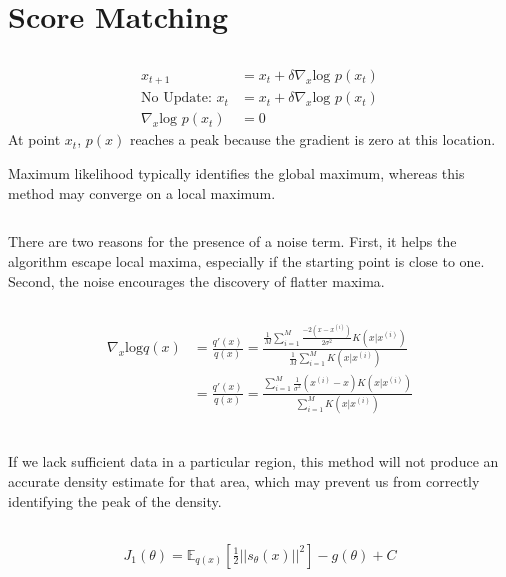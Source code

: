 \documentclass{article}
\newcommand*{\ex}[1]{
    \mathbb{E}_{#1}
}
\begin{document}
\section{Score Matching}
\subsection{}
\begin{align*}
    x_{t+1} &= x_{t} + \delta \nabla_x \text{log } p(x_t) \\
    \text{No Update: } x_t &= x_t + \delta \nabla_x \text{log } p(x_t) \\
    \nabla_x \text{log } p(x_t) &= 0
\end{align*}
At point $x_t$, $p(x)$ reaches a peak because the gradient is zero at this location.

Maximum likelihood typically identifies the global maximum, whereas this method may converge on a local maximum.


\subsection{}
There are two reasons for the presence of a noise term. First, it helps the 
algorithm escape local maxima, especially if the starting point is close to 
one. Second, the noise encourages the discovery of flatter maxima.

\subsection{}
\begin{align*}
    \nabla_x \text{log} q(x) 
    &= \frac{q'(x)}{q(x)} = \frac{\frac{1}{M}\sum_{i=1}^M \frac{-2(x - x^{(i)})}{2\sigma^2}K(x|x^{(i)})}{\frac{1}{M}\sum_{i=1}^M K(x|x^{(i)})} \\
    &= \frac{q'(x)}{q(x)} = \frac{\sum_{i=1}^M \frac{1}{\sigma^2}(x^{(i)} - x)K(x|x^{(i)})}{\sum_{i=1}^M K(x|x^{(i)})} \\
\end{align*}


\subsection{}
If we lack sufficient data in a particular region, this method will not 
produce an accurate density estimate for that area, which may prevent us 
from correctly identifying the peak of the density.


\subsection{}
\begin{align*}
    J_1(\theta) = \ex{q(x)}[\frac{1}{2}||s_{\theta}(x)||^2] - g(\theta) + C
\end{align*}
\end{document}
